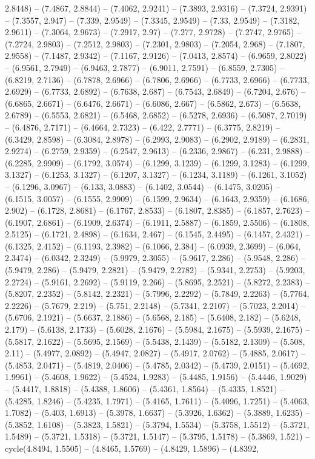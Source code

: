 2.8448) -- (7.4867, 2.8844) -- (7.4062, 2.9241) -- (7.3893, 2.9316) -- (7.3724, 2.9391) -- (7.3557, 2.947) -- (7.339, 2.9549) -- (7.3345, 2.9549) -- (7.33, 2.9549) -- (7.3182, 2.9611) -- (7.3064, 2.9673) -- (7.2917, 2.97) -- (7.277, 2.9728) -- (7.2747, 2.9765) -- (7.2724, 2.9803) -- (7.2512, 2.9803) -- (7.2301, 2.9803) -- (7.2054, 2.968) -- (7.1807, 2.9558) -- (7.1487, 2.9342) -- (7.1167, 2.9126) -- (7.0413, 2.8574) -- (6.9659, 2.8022) -- (6.9561, 2.7949) -- (6.9463, 2.7877) -- (6.9011, 2.7591) -- (6.8559, 2.7305) -- (6.8219, 2.7136) -- (6.7878, 2.6966) -- (6.7806, 2.6966) -- (6.7733, 2.6966) -- (6.7733, 2.6929) -- (6.7733, 2.6892) -- (6.7638, 2.687) -- (6.7543, 2.6849) -- (6.7204, 2.676) -- (6.6865, 2.6671) -- (6.6476, 2.6671) -- (6.6086, 2.667) -- (6.5862, 2.673) -- (6.5638, 2.6789) -- (6.5553, 2.6821) -- (6.5468, 2.6852) -- (6.5278, 2.6936) -- (6.5087, 2.7019) -- (6.4876, 2.7171) -- (6.4664, 2.7323) -- (6.422, 2.7771) -- (6.3775, 2.8219) -- (6.3429, 2.8598) -- (6.3084, 2.8978) -- (6.2993, 2.9083) -- (6.2902, 2.9189) -- (6.2831, 2.9274) -- (6.2759, 2.9359) -- (6.2547, 2.9613) -- (6.2336, 2.9867) -- (6.231, 2.9888) -- (6.2285, 2.9909) -- (6.1792, 3.0574) -- (6.1299, 3.1239) -- (6.1299, 3.1283) -- (6.1299, 3.1327) -- (6.1253, 3.1327) -- (6.1207, 3.1327) -- (6.1234, 3.1189) -- (6.1261, 3.1052) -- (6.1296, 3.0967) -- (6.133, 3.0883) -- (6.1402, 3.0544) -- (6.1475, 3.0205) -- (6.1515, 3.0057) -- (6.1555, 2.9909) -- (6.1599, 2.9634) -- (6.1643, 2.9359) -- (6.1686, 2.902) -- (6.1728, 2.8681) -- (6.1767, 2.8533) -- (6.1807, 2.8385) -- (6.1857, 2.7623) -- (6.1907, 2.6861) -- (6.1909, 2.6374) -- (6.1911, 2.5887) -- (6.1859, 2.5506) -- (6.1808, 2.5125) -- (6.1721, 2.4898) -- (6.1634, 2.467) -- (6.1545, 2.4495) -- (6.1457, 2.4321) -- (6.1325, 2.4152) -- (6.1193, 2.3982) -- (6.1066, 2.384) -- (6.0939, 2.3699) -- (6.064, 2.3474) -- (6.0342, 2.3249) -- (5.9979, 2.3055) -- (5.9617, 2.286) -- (5.9548, 2.286) -- (5.9479, 2.286) -- (5.9479, 2.2821) -- (5.9479, 2.2782) -- (5.9341, 2.2753) -- (5.9203, 2.2724) -- (5.9161, 2.2692) -- (5.9119, 2.266) -- (5.8695, 2.2521) -- (5.8272, 2.2383) -- (5.8207, 2.2352) -- (5.8142, 2.2321) -- (5.7996, 2.2292) -- (5.7849, 2.2263) -- (5.7764, 2.2226) -- (5.7679, 2.219) -- (5.751, 2.2148) -- (5.7341, 2.2107) -- (5.7023, 2.2014) -- (5.6706, 2.1921) -- (5.6637, 2.1886) -- (5.6568, 2.185) -- (5.6408, 2.182) -- (5.6248, 2.179) -- (5.6138, 2.1733) -- (5.6028, 2.1676) -- (5.5984, 2.1675) -- (5.5939, 2.1675) -- (5.5817, 2.1622) -- (5.5695, 2.1569) -- (5.5438, 2.1439) -- (5.5182, 2.1309) -- (5.508, 2.11) -- (5.4977, 2.0892) -- (5.4947, 2.0827) -- (5.4917, 2.0762) -- (5.4885, 2.0617) -- (5.4853, 2.0471) -- (5.4819, 2.0406) -- (5.4785, 2.0342) -- (5.4739, 2.0151) -- (5.4692, 1.9961) -- (5.4608, 1.9622) -- (5.4524, 1.9283) -- (5.4485, 1.9156) -- (5.4446, 1.9029) -- (5.4417, 1.8818) -- (5.4388, 1.8606) -- (5.4361, 1.8564) -- (5.4335, 1.8521) -- (5.4285, 1.8246) -- (5.4235, 1.7971) -- (5.4165, 1.7611) -- (5.4096, 1.7251) -- (5.4063, 1.7082) -- (5.403, 1.6913) -- (5.3978, 1.6637) -- (5.3926, 1.6362) -- (5.3889, 1.6235) -- (5.3852, 1.6108) -- (5.3823, 1.5821) -- (5.3794, 1.5534) -- (5.3758, 1.5512) -- (5.3721, 1.5489) -- (5.3721, 1.5318) -- (5.3721, 1.5147) -- (5.3795, 1.5178) -- (5.3869, 1.521) -- cycle(4.8494, 1.5505) -- (4.8465, 1.5769) -- (4.8429, 1.5896) -- (4.8392, 